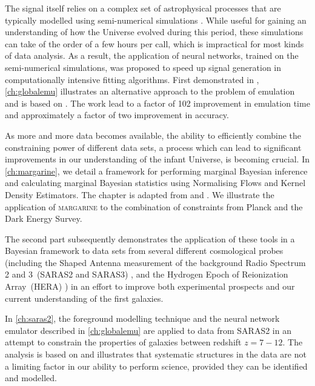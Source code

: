 The signal itself relies on a complex set of astrophysical processes that are typically modelled using semi-numerical simulations \citep[e.g.][]{Visbal_2012, Fialkov_rich_2014, Cohen_global_2017, Reis_sta_2021}. While useful for gaining an understanding of how the Universe evolved during this period, these simulations can take of the order of a few hours per call, which is impractical for most kinds of data analysis. As a result, the application of neural networks, trained on the semi-numerical simulations, was proposed to speed up signal generation in computationally intensive fitting algorithms. First demonstrated in \cite{Cohen2020}, \cref{ch:globalemu} illustrates an alternative approach to the problem of emulation and is based on \cite{Bevins_globalemu_2021}. The work lead to a factor of 102 improvement in emulation time and approximately a factor of two improvement in accuracy.

As more and more data becomes available, the ability to efficiently combine the constraining power of different data sets, a process which can lead to significant improvements in our understanding of the infant Universe, is becoming crucial. In \cref{ch:margarine}, we detail a framework for performing marginal Bayesian inference and calculating marginal Bayesian statistics using Normalising Flows and Kernel Density Estimators. The chapter is adapted from \cite{margarine_neurips} and \cite{margarine_maxent}. We illustrate the application of \textsc{margarine} to the combination of constraints from Planck and the Dark Energy Survey.

The second part subsequently demonstrates the application of these tools in a Bayesian framework to data sets from several different cosmological probes (including the Shaped Antenna measurement of the background Radio Spectrum 2 and 3~(SARAS2 and SARAS3) \cite{SARAS2_radiometer_2018, SARAS3_spectrometer_2020, SARAS3_antenna_2021, SARAS_reciever_2021}, and the Hydrogen Epoch of Reionization Array~(HERA) \cite{HERA_2017}) in an effort to improve both experimental prospects and our current understanding of the first galaxies.

In \cref{ch:saras2}, the foreground modelling technique and the neural network emulator described in \cref{ch:globalemu} are applied to data from SARAS2 in an attempt to constrain the properties of galaxies between redshift $z = 7 -12$. The analysis is based on \cite{Bevins_SARAS2_2022} and illustrates that systematic structures in the data are not a limiting factor in our ability to perform science, provided they can be identified and modelled.

